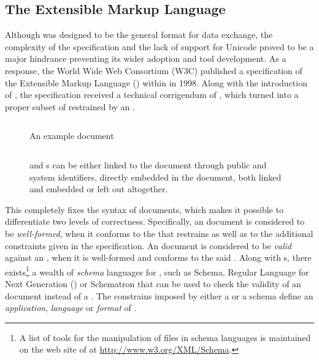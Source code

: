 \documentclass{book}
\begin{document}
      \subsection{The Extensible Markup Language}
        Although  was designed to be the general format for data
        exchange, the complexity of the specification and the lack of support
        for Unicode proved to be a major hindrance preventing its wider
        adoption and tool development. As a response, the World Wide Web
        Consortium (W3C) published a specification of the Extensible Markup
        Language () within \cite{bray98} in 1998. Along with the
        introduction of , the  specification received
        a technical corrigendum of \cite{goldfarb97:webSGML}, which turned
         into a proper subset of  restrained by an
         .
        
        \begin{figure}
          \inputminted{xml}{examples/02/recipe.xml}
          \caption{An example  document}
          \label{fig:recipe}\bigskip
          \inputminted{dtd}{examples/02/dtdtypes}
          \caption{ and  s can be either
            linked to the document through public and system identifiers, directly
            embedded in the document, both linked and embedded or left out
            altogether.}
          \label{fig:recipe-dtd}
        \end{figure}
        
        This  completely fixes the syntax of 
        documents, which makes it possible to differentiate two levels of
        correctness. Specifically, an  document is considered to be
        \emph{well-formed}, when it conforms to the  
        that restrains  as well as to the additional constraints
        given in the specification. An  document is considered to
        be \emph{valid} against an  , when it
        is well-formed and conforms to the said  .
        Along with s, there exists\footnote{
          A list of tools for the manipulation of files in  schema
          languages is maintained on the web site of  at
          \url{http://www.w3.org/XML/Schema}.
        } a wealth of \emph{schema} languages for , such as
         Schema, Regular Language for  Next
        Generation () or Schematron that can be used to check
        the validity of an  document instead of a .
        The constrains imposed by either a  or a schema define an
        \emph{application}, \emph{language} or \emph{format} of .
\end{document}
